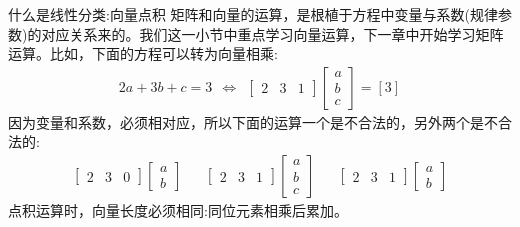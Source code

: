 \documentclass[handout]{beamer}
\begin{document}
\begin{frame}{什么是线性分类:向量点积}
矩阵和向量的运算，是根植于方程中变量与系数(规律参数)的对应关系来的。我们这一小节中重点学习向量运算，下一章中开始学习矩阵运算。比如，下面的方程可以转为向量相乘:
		\begin{align*}
			2a + 3b + c = 3 \ \ \Leftrightarrow \ \ \begin{bmatrix}
				2 & 3 & 1
			\end{bmatrix} \begin{bmatrix}
				a \\
				b \\
				c
			\end{bmatrix} = [3] 
		\end{align*}
		因为变量和系数，必须相对应，所以下面的运算一个是不合法的，另外两个是不合法的:
		\begin{align*}
			\begin{bmatrix}
				2 & 3 & 0
			\end{bmatrix} \begin{bmatrix}
				a \\
				b 
			\end{bmatrix} & & \begin{bmatrix}
				2 & 3 & 1
			\end{bmatrix} \begin{bmatrix}
				a \\
				b \\
				c
			\end{bmatrix} & & \begin{bmatrix}
				2 & 3 & 1
			\end{bmatrix} \begin{bmatrix}
				a \\
				b 
			\end{bmatrix}
		\end{align*}	
		点积运算时，向量长度必须相同:同位元素相乘后累加。
\end{frame}
\end{document}
